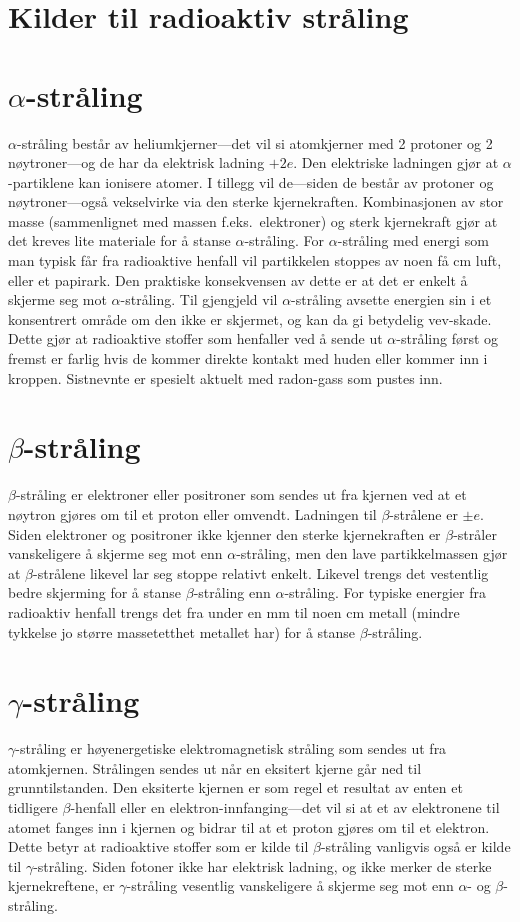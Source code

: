 \section{Kilder til radioaktiv stråling}


\section{$\alpha$-stråling}
$\alpha$-stråling består av heliumkjerner---det vil si atomkjerner med 2 protoner og 2 nøytroner---og de har da elektrisk ladning $+2e$. Den elektriske ladningen gjør at $\alpha$-partiklene kan ionisere atomer. I tillegg vil de---siden de består av protoner og nøytroner---også vekselvirke via den sterke kjernekraften. Kombinasjonen av stor masse (sammenlignet med massen f.eks.~elektroner) og sterk kjernekraft gjør at det kreves lite materiale for å stanse $\alpha$-stråling. For $\alpha$-stråling med energi som man typisk får fra radioaktive henfall vil partikkelen stoppes av noen få cm luft, eller et papirark. Den praktiske konsekvensen av dette er at det er enkelt å skjerme seg mot $\alpha$-stråling. Til gjengjeld vil $\alpha$-stråling avsette energien sin i et konsentrert område om den ikke er skjermet, og kan da gi betydelig vev-skade. Dette gjør at radioaktive stoffer som henfaller ved å sende ut $\alpha$-stråling først og fremst er farlig hvis de kommer direkte kontakt med huden eller kommer inn i kroppen. Sistnevnte er spesielt aktuelt med radon-gass som pustes inn.

\section{$\beta$-stråling}
$\beta$-stråling er elektroner eller positroner som sendes ut fra kjernen ved at et nøytron gjøres om til et proton eller omvendt. Ladningen til $\beta$-strålene er $\pm e$. Siden elektroner og positroner ikke kjenner den sterke kjernekraften er $\beta$-stråler vanskeligere å skjerme seg mot enn $\alpha$-stråling, men den lave partikkelmassen gjør at $\beta$-strålene likevel lar seg stoppe relativt enkelt. Likevel trengs det vestentlig bedre skjerming for å stanse $\beta$-stråling enn $\alpha$-stråling. For typiske energier fra radioaktiv henfall trengs det fra under en mm til noen cm metall (mindre tykkelse jo større massetetthet metallet har) for å stanse $\beta$-stråling.

\section{$\gamma$-stråling}
$\gamma$-stråling er høyenergetiske elektromagnetisk stråling som sendes ut fra atomkjernen. Strålingen sendes ut når en eksitert kjerne går ned til grunntilstanden. Den eksiterte kjernen er som regel et resultat av enten et tidligere $\beta$-henfall eller en elektron-innfanging---det vil si at et av elektronene til atomet fanges inn i kjernen og bidrar til at et proton gjøres om til et elektron. Dette betyr at radioaktive stoffer som er kilde til $\beta$-stråling vanligvis også er kilde til $\gamma$-stråling. Siden fotoner ikke har elektrisk ladning, og ikke merker de sterke kjernekreftene, er $\gamma$-stråling vesentlig vanskeligere å skjerme seg mot enn $\alpha$- og $\beta$-stråling. 


